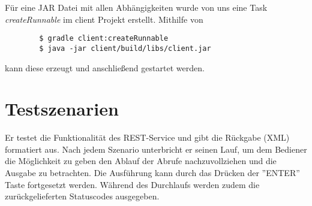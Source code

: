\documentclass[12pt]{scrartcl}
\begin{document}
	Für eine JAR Datei mit allen Abhängigkeiten wurde von uns eine Task \emph{createRunnable} im client Projekt erstellt. Mithilfe von
	\begin{verbatim}
		$ gradle client:createRunnable
		$ java -jar client/build/libs/client.jar
	\end{verbatim}
	
	kann diese erzeugt und anschließend gestartet werden.
	
\section{Testszenarien}
	
	Er testet die Funktionalität des REST-Service und gibt die Rückgabe (XML) formatiert aus. Nach jedem Szenario unterbricht er seinen Lauf, um dem Bediener die Möglichkeit zu geben den Ablauf der Abrufe nachzuvollziehen und die Ausgabe zu betrachten. Die Ausführung kann durch das Drücken der ''ENTER'' Taste fortgesetzt werden. Während des Durchlaufs werden zudem die zurückgelieferten Statuscodes ausgegeben.
	
\end{document}
